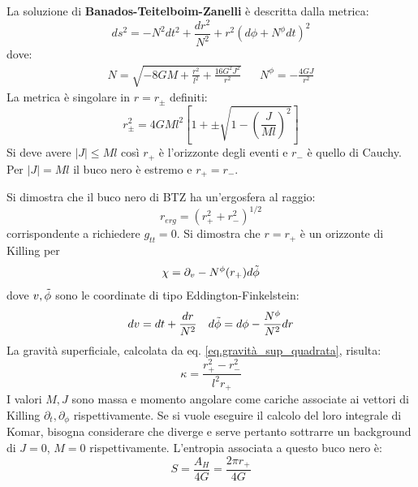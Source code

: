 La soluzione di \textbf{Banados-Teitelboim-Zanelli} \cite{btz} è descritta dalla metrica:
\begin{equation}
    ds^2 = - N^2dt^2 + \frac{dr^2}{N^2} + r^2(d\phi + N^\phi dt)^2
    \label{eq.metrica_btz}
\end{equation}
dove:
\begin{align*}
    N = \sqrt{-8GM + \frac{r^2}{l^2} + \frac{16 G^2 J^2}{r^2}} && N^\phi = - \frac{4GJ}{r^2}
\end{align*}
La metrica è singolare in $r= r_\pm$ definiti:
\begin{equation*}
    r_\pm^2 = 4GMl^2 \left[1 + \pm \sqrt{1 - \left(\frac{J}{Ml}\right)^2}\right]
\end{equation*}
Si deve avere $|J|\leq Ml$ così $r_+$ è l'orizzonte degli eventi e $r_-$ è quello di Cauchy. Per $|J| = Ml$ il buco nero è estremo e $r_+=r_-$.

Si dimostra che il buco nero di BTZ ha un'ergosfera al raggio:
\begin{equation}
    r_{erg}= (r_+^2 + r_-^2)^{1/2}
\end{equation}
corrispondente a richiedere $g_{tt} = 0$. Si dimostra che $r=r_+$ è un orizzonte di Killing per
\begin{equation*}
    \chi = \partial_v - N^\phi(r_+)d\Tilde{\phi}
\end{equation*}
dove $v, \Tilde{\phi}$ sono le coordinate di tipo Eddington-Finkelstein:
\begin{align*}
    dv = dt + \frac{dr}{N^2} && d\Tilde{\phi} = d\phi - \frac{N^\phi}{N^2}dr
\end{align*}
La gravità superficiale, calcolata da eq. \ref{eq.gravità_sup_quadrata}, risulta:
\begin{equation}
    \kappa = \frac{r_+^2 -r_-^2}{l^2r_+}
    \label{eq.grav_sup_btz}
\end{equation}
I valori $M, J$ sono massa e momento angolare come cariche associate ai vettori di Killing $\partial_t, \partial_\phi$ rispettivamente. Se si vuole eseguire il calcolo del loro integrale di Komar, bisogna considerare che diverge e serve pertanto sottrarre un background di $J=0$, $M=0$ rispettivamente.
L'entropia associata a questo buco nero è:
\begin{equation*}
    S = \frac{A_H}{4G} = \frac{2\pi r_+}{4G}
\end{equation*}

